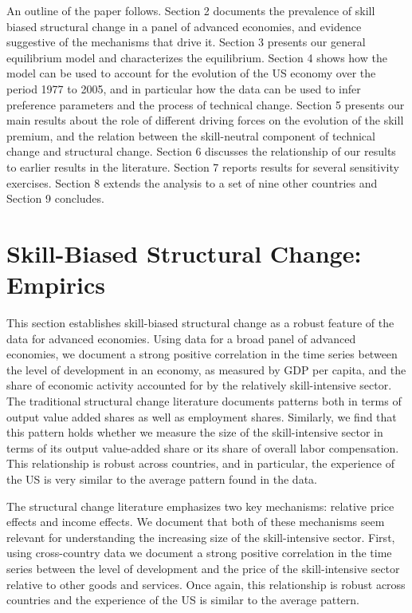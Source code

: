 \documentclass[12pt,english]{article}
\begin{document}
An outline of the paper follows. Section 2 documents the prevalence of skill
biased structural change in a panel of advanced economies, and evidence
suggestive of the mechanisms that drive it. Section 3 presents our general
equilibrium model and characterizes the equilibrium. Section 4 shows how the
model can be used to account for the evolution of the US economy over the
period 1977 to 2005, and in particular how the data can be used to infer
preference parameters and the process of technical change. Section 5
presents our main results about the role of different driving forces on the
evolution of the skill premium, and the relation between the skill-neutral
component of technical change and structural change. Section 6 discusses the
relationship of our results to earlier results in the literature. Section 7
reports results for several sensitivity exercises. Section 8 extends the
analysis to a set of nine other countries and Section 9 concludes.

\section{Skill-Biased Structural Change: Empirics}

This section establishes skill-biased structural change as a robust feature
of the data for advanced economies. Using data for a broad panel of advanced
economies, we document a strong positive correlation in the time series
between the level of development in an economy, as measured by GDP per
capita, and the share of economic activity accounted for by the relatively
skill-intensive sector. The traditional structural change literature
documents patterns both in terms of output value added shares as well as
employment shares. Similarly, we find that this pattern holds whether we
measure the size of the skill-intensive sector in terms of its output
value-added share or its share of overall labor compensation. This
relationship is robust across countries, and in particular, the experience
of the US is very similar to the average pattern found in the data.

The structural change literature emphasizes two key mechanisms: relative
price effects and income effects. We document that both of these mechanisms
seem relevant for understanding the increasing size of the skill-intensive
sector. First, using cross-country data we document a strong positive
correlation in the time series between the level of development and the
price of the skill-intensive sector relative to other goods and services.
Once again, this relationship is robust across countries and the experience
of the US is similar to the average pattern.
\end{document}
